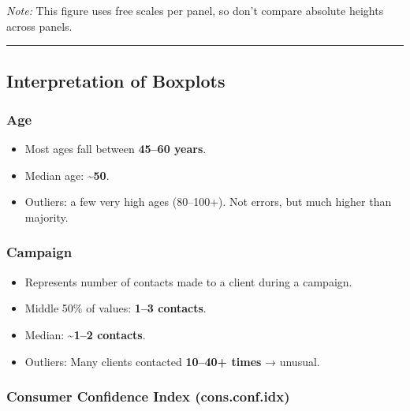 \documentclass[
]{article}
\providecommand{\tightlist}{%
  \setlength{\itemsep}{0pt}\setlength{\parskip}{0pt}}
\begin{document}
\emph{Note:} This figure uses free scales per panel, so don't compare
absolute heights across panels.

\begin{center}\rule{0.5\linewidth}{0.5pt}\end{center}

\subsection{Interpretation of
Boxplots}\label{interpretation-of-boxplots}

\subsubsection{Age}\label{age}

\begin{itemize}
\tightlist
\item
  Most ages fall between \textbf{45--60 years}.\\
\item
  Median age: \textbf{\textasciitilde50}.\\
\item
  Outliers: a few very high ages (80--100+). Not errors, but much higher
  than majority.
\end{itemize}

\subsubsection{Campaign}\label{campaign}

\begin{itemize}
\tightlist
\item
  Represents number of contacts made to a client during a campaign.\\
\item
  Middle 50\% of values: \textbf{1--3 contacts}.\\
\item
  Median: \textasciitilde{}\textbf{1--2 contacts}.\\
\item
  Outliers: Many clients contacted \textbf{10--40+ times} → unusual.
\end{itemize}

\subsubsection{Consumer Confidence Index
(cons.conf.idx)}\label{consumer-confidence-index-cons.conf.idx}
\end{document}
